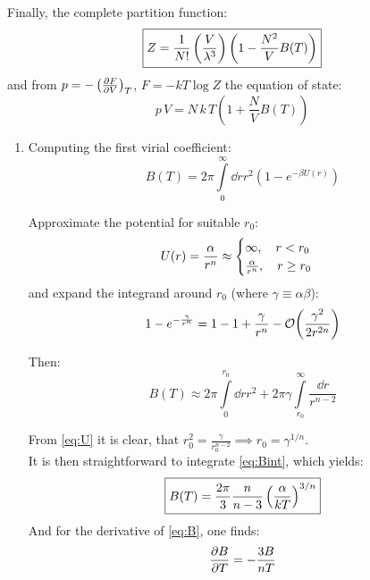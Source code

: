 \documentclass[11pt,a4paper]{scrartcl}
\newcommand{\thermpart}[3]{\left(\pdv{#1}{#2}\right)_{#3}}
\begin{document}
Finally, the complete partition function:
\begin{equation}
    \boxed{%
    Z=\frac{1}{N!}\left(\frac{V}{\lambda^3}\right)\left(1-\frac{N^2}{V}B(T)\right)}
    \label{eq:Z}
\end{equation}
and from $p=-\thermpart{F}{V}{T}$, $F=-kT\log{Z}$ the equation of state:
\begin{equation}
    \boxed{p\,V=N\,k\,T\left(1+\frac{N}{V}B(T)\right)}
    \label{eq:EOS}
\end{equation}


\begin{enumerate}[label=\textbf{\large(\alph*)}, itemsep=2\baselineskip]

\item
    Computing the first virial coefficient:
    \begin{equation*}
        B(T)=2\pi\int\limits_{0}^{\infty}\dd{r}r^2\left(1-e^{-\beta{U}(r)}\right)
    \end{equation*}

    Approximate the potential for suitable $r_0$:
    \begin{equation}
        U(r)=\frac{\alpha}{r^n}\approx
        \begin{cases}
            \infty\qc r<r_0 \\
            \frac{\alpha}{r^n}\qc r\geq r_0
        \end{cases}
        \label{eq:U}
    \end{equation}
    and expand the integrand around $r_0$ (where $\gamma\equiv\alpha\beta$):
    \begin{equation*}
        1-e^{-\frac{\gamma}{r^n}}=1-1+\frac{\gamma}{r^n}-\order{\frac{\gamma^2}{2r^{2n}}}
    \end{equation*}

    Then:
    \begin{equation}
        B(T)\approx
        2\pi\int\limits_{0}^{r_0}\dd{r}r^2+2\pi\gamma\int\limits_{r_0}^{\infty}\frac{\dd{r}}{r^{n-2}}
        \label{eq:Bint}
    \end{equation}

    From \eqref{eq:U} it is clear, that
    $r_0^2=\frac{\gamma}{r_{0}^{n-2}}\implies r_0=\gamma^{1/n}$. \\
    It is then straightforward to integrate \eqref{eq:Bint}, which yields:
    \begin{equation}
        \boxed{%
        B(T)=\frac{2\pi}{3}\frac{n}{n-3}\left(\frac{\alpha}{kT}\right)^{3/n}}
        \label{eq:B}
    \end{equation}
    And for the derivative of \eqref{eq:B}, one finds:
    \begin{equation*}
        \pdv{B}{T}=-\frac{3B}{nT}
    \end{equation*}



\end{enumerate}
\end{document}
